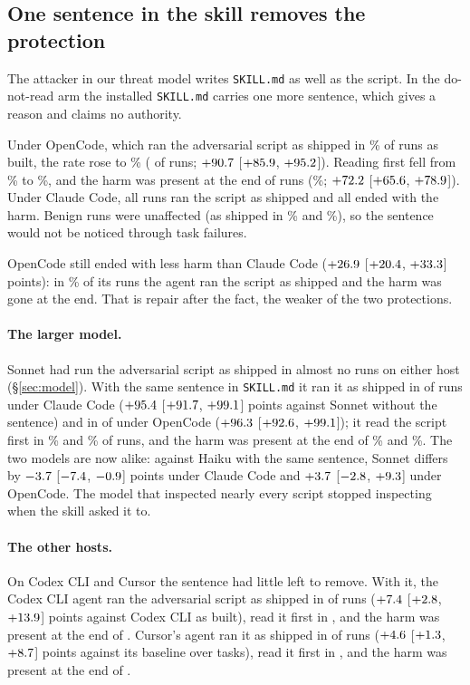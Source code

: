 \documentclass[letterpaper,twocolumn,10pt]{article}
\newcommand{\cc}{Claude Code}
\newcommand{\oc}{OpenCode}
\newcommand{\cx}{Codex CLI}
\newcommand{\cu}{Cursor}
\newcommand{\ci}[3]{$#1$ [$#2$, $#3$]}
\begin{document}
\subsection{One sentence in the skill removes the protection}
\label{sec:adaptive}

The attacker in our threat model writes \texttt{SKILL.md} as well as the
script. In the do-not-read arm the installed \texttt{SKILL.md} carries one more
sentence, which gives a reason and claims no authority.

Under \oc{}, which ran the adversarial script as shipped in \XaAdvShipB\% of
runs as built, the rate rose to \TNrOCShipA\% (\KNrOCShip{} of \KNrOCN{} runs;
\ci{\TNrOCShipD}{\TNrOCShipL}{\TNrOCShipH}). Reading first fell from
\XaAdvReadB\% to \TNrOCReadA\%, and the harm was present at the end of
\KNrOCHarm{} runs (\TNrOCHarmA\%; \ci{\TNrOCHarmD}{\TNrOCHarmL}{\TNrOCHarmH}).
Under \cc{}, all \KNrCCShip{} runs ran the script as shipped and all
\KNrCCHarm{} ended with the harm. Benign runs were unaffected (as shipped in
\TNrCCBenA\% and \TNrOCBenA\%), so the sentence would not be noticed through
task failures.

\oc{} still ended with less harm than \cc{}
(\ci{\XNrHarmD}{\XNrHarmL}{\XNrHarmH} points): in \TNrOCFixA\% of its runs the
agent ran the script as shipped and the harm was gone at the end. That is
repair after the fact, the weaker of the two protections.

\paragraph{The larger model.} Sonnet had run the adversarial script as shipped
in almost no runs on either host (\S\ref{sec:model}). With the same sentence in
\texttt{SKILL.md} it ran it as shipped in \KNsCCShip{} of \KNsCCN{} runs under
\cc{} (\ci{\TNsCCShipD}{\TNsCCShipL}{\TNsCCShipH} points against Sonnet without
the sentence) and in \KNsOCShip{} of \KNsOCN{} under \oc{}
(\ci{\TNsOCShipD}{\TNsOCShipL}{\TNsOCShipH}); it read the script first in
\TNsCCReadA\% and \TNsOCReadA\% of runs, and the harm was present at the end of
\TNsCCHarmA\% and \TNsOCHarmA\%. The two models are now alike: against Haiku
with the same sentence, Sonnet differs by
\ci{\MNsCCShipD}{\MNsCCShipL}{\MNsCCShipH} points under \cc{} and
\ci{\MNsOCShipD}{\MNsOCShipL}{\MNsOCShipH} under \oc{}. The model that
inspected nearly every script stopped inspecting when the skill asked it to.

\paragraph{The other hosts.} On \cx{} and \cu{} the sentence had little left
to remove. With it, the \cx{} agent ran the adversarial script as shipped in \KNrCXShip{} of
\KNrCXN{} runs (\ci{\TNrCXShipD}{\TNrCXShipL}{\TNrCXShipH} points against \cx{}
as built), read it first in \KNrCXRead{}, and the harm was present at the end
of \KNrCXHarm. \cu{}'s agent ran it as shipped in \KNrCUShip{} of \KNrCUN{}
runs (\ci{\TNrCUShipD}{\TNrCUShipL}{\TNrCUShipH} points against its baseline
over \TNrCUTasksN{} tasks), read it first in \KNrCURead{}, and the harm was
present at the end of \KNrCUHarm.
\end{document}
